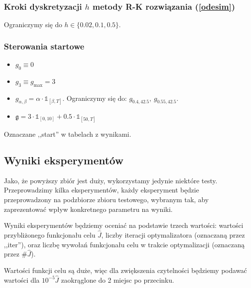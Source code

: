 \documentclass[11pt]{article}
\def\1{\mathds{1}}
\begin{document}
\subsubsection{Kroki dyskretyzacji $h$ metody R-K rozwiązania (\ref{odesim})}
Ograniczymy się do $h \in \{0.02, 0.1, 0.5\}$.
\subsubsection{Sterowania startowe}
\begin{itemize}
\item $g_0\equiv 0$
\item $g_{3} \equiv g_{\max} = 3$
\item $g_{\alpha,\beta} = \alpha \cdot \1_{[\beta, T]}$. Ograniczymy się do: $g_{0.4,42.5},\ g_{0.55,42.5}$.
\item $\mathfrak{g} = 3 \cdot \1_{[0,10]} + 0.5 \cdot \1_{[50, T]}$
\end{itemize}
Oznaczane ,,start'' w tabelach z wynikami.

\subsection{Wyniki eksperymentów}
Jako, że powyższy zbiór jest duży, wykorzystamy jedynie niektóre testy. Przeprowadzimy kilka eksperymentów, każdy eksperyment będzie przeprowadzony na podzbiorze zbioru testowego, wybranym tak, aby zaprezentować wpływ konkretnego parametru na wyniki.

Wyniki eksperymentów będziemy oceniać na podstawie trzech wartości: wartości przybliżonego funkcjonału celu $\hat{J}$, liczby iteracji optymalizatora (oznaczaną przez ,,iter''), oraz liczbę wywołań funkcjonału celu w trakcie optymalizacji (oznaczaną przez $\#\hat{J}$).

Wartości funkcji celu są duże, więc dla zwiększenia czytelności będziemy podawać wartości dla $10^{-5}\hat{J}$ zaokrąglone do 2 miejsc po przecinku.
\end{document}
